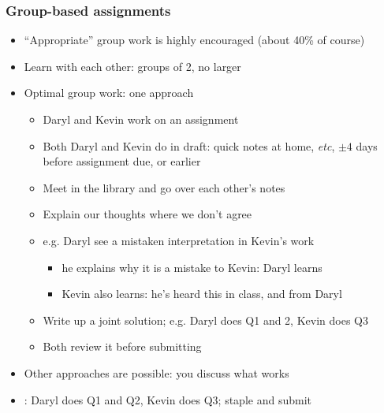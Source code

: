 \begin{frame}\frametitle{Group-based assignments}
	\begin{itemize}
		\item	``Appropriate'' group work is highly encouraged (about 40\% of course)
		\item	Learn with each other: groups of 2, no larger
		\item	Optimal group work: one approach
			\begin{itemize}
				\item	Daryl and Kevin work on an assignment
				\item	Both Daryl and Kevin do {} in draft: quick notes at home, \emph{etc}, $\pm 4$ days before assignment due, or earlier
				\item	Meet in the library and go over each other's notes
				\item	Explain our thoughts where we don't agree
				\item	e.g. Daryl see a mistaken interpretation in Kevin's work
				\begin{itemize}
					\item	he explains why it is a mistake to Kevin: Daryl learns
					\item	Kevin also learns: he's heard this in class, and from Daryl
				\end{itemize}
				\item	Write up a joint solution; e.g. Daryl does Q1 and 2, Kevin does Q3
				\item	Both review it before submitting
			\end{itemize}
			
		\item	Other approaches are possible: you discuss what works
		\item	\color{myOrange}{What doesn't work}: Daryl does Q1 and Q2, Kevin does Q3; staple and submit
	\end{itemize}
\end{frame}

